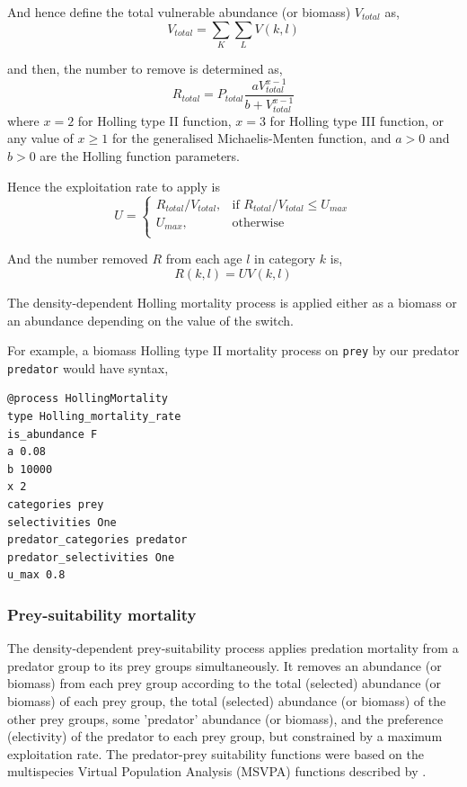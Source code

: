 And hence define the total vulnerable abundance (or biomass) $V_{total}$ as,
\begin{equation}
  V_{total}  = \sum\limits_K {\sum\limits_L {V(k,l)}} 
\end{equation}

and then, the number to remove is determined as,
\begin{equation}
R_{total} = P_{total} \frac{a  V_{total}^{x-1}}{b + V_{total}^{x-1}}
\end{equation}
where $x=2$ for Holling type II function,  $x=3$ for Holling type III function, or any value of $x \geq 1$ for the generalised Michaelis-Menten function, and $a > 0$ and $b > 0$ are the Holling function parameters.

Hence the exploitation rate to apply is 
\begin{equation}
U = \begin{cases}
  R_{total}/V_{total}, & \text{if $R_{total}/V_{total} \leq U_{max}$} \\
  U_{max}, & \text{otherwise}\\ 
  \end{cases} 
\end{equation}

And the number removed $R$ from each age $l$ in category $k$ is,
\begin{equation}
  R(k,l) = UV(k,l)
\end{equation}

The density-dependent Holling mortality process is applied either as a biomass or an abundance depending on the value of the  switch.

For example, a biomass Holling type II mortality process on \texttt{prey} by our predator \texttt{predator} would have syntax,

{\small{\begin{verbatim}
@process HollingMortality
type Holling_mortality_rate
is_abundance F
a 0.08
b 10000
x 2
categories prey
selectivities One
predator_categories predator
predator_selectivities One
u_max 0.8
\end{verbatim}}}

\subsubsection*{Prey-suitability mortality}

The density-dependent prey-suitability process applies predation mortality from a predator group to its prey groups simultaneously. It removes an abundance (or biomass) from each prey group according to the total (selected) abundance (or biomass) of each prey group, the total (selected) abundance (or biomass) of the other prey groups, some 'predator' abundance (or biomass), and the preference (electivity) of the predator to each prey group, but constrained by a maximum exploitation rate. The predator-prey suitability functions were based on the multispecies Virtual Population Analysis (MSVPA) functions described by \citep{JuradoMolina2005}.

